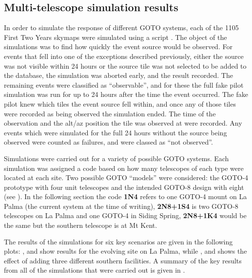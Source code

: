 \subsection{Multi-telescope simulation results}
\label{sec:gw_sim_results}
\begin{colsection}

In order to simulate the response of different GOTO systems, each of the 1105 First Two Years skymaps \citep{First2Years} were simulated using a script . The object of the simulations was to find how quickly the event source would be observed. For events that fell into one of the exceptions described previously, either the source was not visible within 24 hours or the source tile was not selected to be added to the database, the simulation was aborted early, and the result recorded. The remaining events were classified as ``observable'', and for these the full fake pilot simulation was run for up to 24 hours after the time the event occurred. The fake pilot knew which tiles the event source fell within, and once any of those tiles were recorded as being observed the simulation ended. The time of the observation and the alt/az position the tile was observed at were recorded. Any events which were simulated for the full 24 hours without the source being observed were counted as failures, and were classed as ``not observed''.

Simulations were carried out for a variety of possible GOTO systems. Each simulation was assigned a code based on how many telescopes of each type were located at each site. Two possible GOTO ``models'' were considered: the GOTO-4 prototype with four unit telescopes and the intended GOTO-8 design with eight (see ). In the following section the code \textbf{1N4} refers to one GOTO-4 mount on La Palma (the current system at the time of writing), \textbf{2N8+1S4} is two GOTO-8 telescopes on La Palma and one GOTO-4 in Siding Spring, \textbf{2N8+1K4} would be the same but the southern telescope is at Mt Kent.

The results of the simulations for six key scenarios are given in the following plots: ,  and  show results for the evolving site on La Palma, while ,  and  shows the effect of adding three different southern facilities. A summary of the key results from all of the simulations that were carried out is given in .


\end{colsection}
